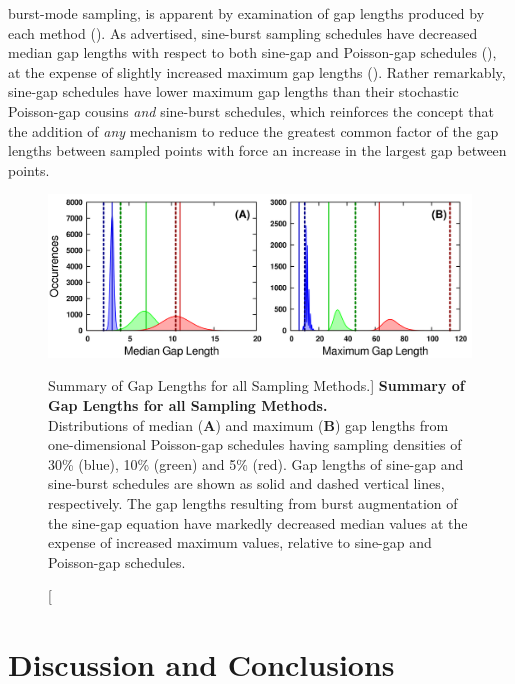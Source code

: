 \begin{doublespace}
burst-mode sampling, is apparent by examination of gap lengths produced by
each method (). As advertised, sine-burst
sampling schedules have decreased median gap lengths with respect to both
sine-gap and Poisson-gap schedules (),
at the expense of slightly increased maximum gap lengths
(). Rather remarkably, sine-gap schedules
have lower maximum gap lengths than their stochastic Poisson-gap cousins
\emph{and} sine-burst schedules, which reinforces the concept that the
addition of \emph{any} mechanism to reduce the greatest common factor of
the gap lengths between sampled points with force an increase in the
largest gap between points.
\end{doublespace}


\begin{figure}[ht!]
\includegraphics[width=6.5in]{figs/dgs/10-gaps.png}
\caption
      [Summary of Gap Lengths for all Sampling Methods.]{
  {\bf Summary of Gap Lengths for all Sampling Methods.}
  \\
  Distributions of median ({\bf A}) and maximum ({\bf B}) gap lengths from
  one-dimensional Poisson-gap schedules having sampling densities of
  30\% (blue), 10\% (green) and 5\% (red). Gap lengths of sine-gap and
  sine-burst schedules are shown as solid and dashed vertical lines,
  respectively. The gap lengths resulting from burst augmentation of the
  sine-gap equation have markedly decreased median values at the expense
  of increased maximum values, relative to sine-gap and Poisson-gap schedules.
}
\label{figure.2.10}
\end{figure}

\section{Discussion and Conclusions}

